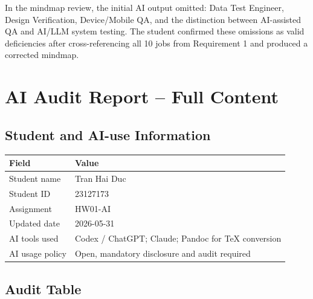 \documentclass[12pt, a4paper]{article}
\begin{document}
In the mindmap review, the initial AI output omitted: Data Test Engineer, Design Verification, Device/Mobile QA, and the distinction between AI-assisted QA and AI/LLM system testing. The student confirmed these omissions as valid deficiencies after cross-referencing all 10 jobs from Requirement 1 and produced a corrected mindmap.

\section{AI Audit Report -- Full Content}

\subsection{Student and AI-use Information}

\begin{table}[h!]
\centering
\begin{tabularx}{\textwidth}{@{} L{5cm} X @{}}
\toprule
{}
\textbf{Field} & \textbf{Value} \\
\midrule
Student name & Tran Hai Duc \\
Student ID & 23127173 \\
Assignment & HW01-AI \\
Updated date & 2026-05-31 \\
AI tools used & Codex / ChatGPT; Claude; Pandoc for TeX conversion \\
AI usage policy & Open, mandatory disclosure and audit required \\
\bottomrule
\end{tabularx}
\end{table}

\subsection{Audit Table}
\end{document}
